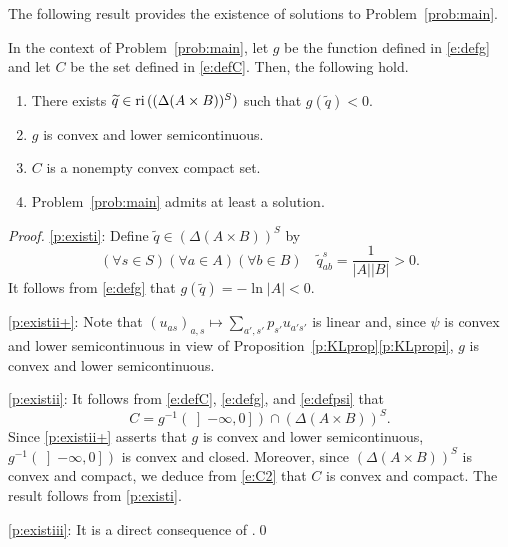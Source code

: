 \documentclass[smallextended,referee,envcountsect,]{svjour3}
\newcommand{\RM}{\ensuremath{\left]-\infty,0\right]}}
\newcommand{\reli}{\ensuremath{\text{\rm ri}\,}}
\begin{document}
 
The following result provides the existence of solutions to 
Problem~\ref{prob:main}.
\begin{proposition}
\label{p:exist}
In the context of Problem~\ref{prob:main}, 
let $g$ be the function defined in \eqref{e:defg} and let 
$C$ be the set defined in \eqref{e:defC}. Then, the following hold.
\begin{enumerate}
\item 
\label{p:existi}
There exists $\widetilde{q}\in{\reli((\Delta(A\times 
B))^S)}$ such that
$g(\widetilde{q})<0$.

\item
\label{p:existii+}
$g$ is convex and lower semicontinuous.
\item 
\label{p:existii}
$C$ is a nonempty convex compact set.
\item 
\label{p:existiii}
Problem~\ref{prob:main} admits at least a solution.
\end{enumerate}
\end{proposition}
\begin{proof}
\ref{p:existi}:
Define $\widetilde{q}\in(\Delta(A\times B))^S$ by
\begin{equation}
(\forall s\in S)(\forall a\in A)(\forall b\in B)\quad 
\widetilde{q}_{ab}^s=\dfrac{1}{|A||B|}{>0}.
\end{equation}
It follows from \eqref{e:defg} that $g(\widetilde{q})=-\ln|A|<0$.


\ref{p:existii+}: Note that $(u_{as})_{a,s}\mapsto 
\sum_{a',s'}p_{s'}u_{a's'}$ is linear and, since $\psi$ is convex and 
lower semicontinuous in view of 
Proposition~\ref{p:KLprop}\eqref{p:KLpropi}, $g$ is convex and 
lower semicontinuous. 

\ref{p:existii}: It follows from \eqref{e:defC}, \eqref{e:defg}, and 
\eqref{e:defpsi} that 
\begin{equation}
\label{e:C2}
C=g^{-1}(\RM)\cap(\Delta(A\times B))^S.
\end{equation}
Since \ref{p:existii+} asserts that $g$ is
convex and lower semicontinuous, $g^{-1}(\RM)$ is convex and 
closed.
Moreover, since $(\Delta(A\times B))^S$ is convex and compact,
we deduce from \eqref{e:C2} that
$C$ is convex and compact. The result follows from \ref{p:existi}.

\ref{p:existiii}: It is a direct consequence of 
\cite[Theorem~2.12]{Beck2017}.\qed
\end{proof}
\end{document}
